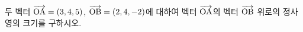 두 벡터 $\overrightarrow{\mathrm{OA}}=(3{,}\mkern3mu\mathopen{}4{,}\mkern3mu\mathopen{}5)$, $\overrightarrow{\mathrm{OB}}=(2{,}\mkern3mu\mathopen{}4{,}\mkern3mu\mathopen{}-2)$에 대하여 벡터 $\overrightarrow{\mathrm{OA}}$의 벡터 $\overrightarrow{\mathrm{OB}}$ 위로의 정사영의 크기를 구하시오.
